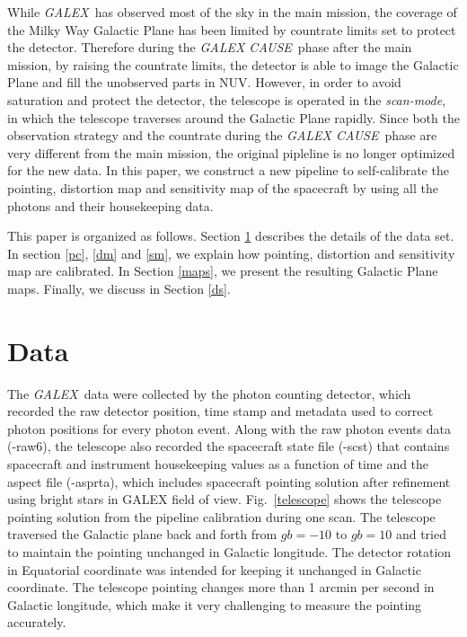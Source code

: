 \documentclass[12pt, preprint]{aastex}
\newcommand{\project}[1]{\textsl{#1}}
\newcommand{\galex}{\project{GALEX}}
\newcommand{\cause}{\project{GALEX CAUSE}}
\newcommand{\scanmode}{\project{scan-mode}}
\begin{document}
While \galex\ has observed most of the sky in the main mission, the coverage of the Milky Way Galactic Plane has been limited by countrate limits set to protect the detector.
Therefore during the \cause\ phase after the main mission, by raising the countrate limits, the detector is able to image the Galactic Plane and fill the unobserved parts in NUV.
However, in order to avoid saturation and protect the detector, the telescope is operated in the \scanmode, in which the telescope traverses around the Galactic Plane rapidly.
Since both the observation strategy and the countrate during the \cause\ phase are very different from the main mission, the original pipleline is no longer optimized for the new data.
In this paper, we construct a new pipeline to self-calibrate the pointing, distortion map and sensitivity map of the spacecraft by using all the photons and their housekeeping data.

This paper is organized as follows. 
Section \ref{data} describes the details of the data set.
In section \ref{pc}, \ref{dm} and \ref{sm}, we explain how pointing, distortion and sensitivity map are calibrated.
In Section \ref{maps}, we present the resulting Galactic Plane maps.
Finally, we discuss in Section \ref{ds}.

\section{Data}
\label{data}
The \galex\ data were collected by the photon counting detector, which recorded the raw detector position, time stamp and metadata used to correct photon positions for every photon event.
Along with the raw photon events data (-raw6), the telescope also recorded the spacecraft state file (-scst) that contains spacecraft and instrument housekeeping values as a function of time and the aspect file (-asprta), which includes spacecraft pointing solution after refinement using bright stars in GALEX field of view.
Fig.~\ref{telescope} shows the telescope pointing solution from the pipeline calibration during one scan.
The telescope traversed the Galactic plane back and forth from $gb=-10$ to $gb=10$ and tried to maintain the pointing unchanged in Galactic longitude.
The detector rotation in Equatorial coordinate was intended for keeping it unchanged in Galactic coordinate.
The telescope pointing changes more than 1 arcmin per second in Galactic longitude, which make it very challenging to measure the pointing accurately.
\end{document}
